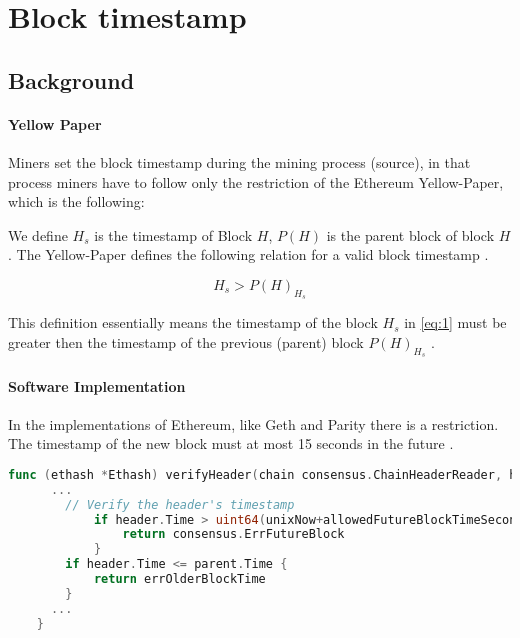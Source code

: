 \section{Block timestamp}

\subsection{Background}

\paragraph{Yellow Paper}
Miners set the block timestamp during the mining process (source), in
that process miners have to follow only the restriction of the Ethereum
Yellow-Paper, which is the following:

We define $H_s$ is the timestamp of Block $H$, $P(H)$ is the parent
block of block $H$. The Yellow-Paper defines the following relation for a valid
block timestamp \cite{ethyellowpaper2023}.

\begin{equation} \label{eq:1}
H_s > P(H)_{H_s}
\end{equation}

This definition essentially means the timestamp of the block $H_s$ in
\ref{eq:1} must be greater then the timestamp of the previous (parent) block
$P(H)_{H_s}$ \cite{ethyellowpaper2023}.

\paragraph{Software Implementation}
In the implementations of Ethereum, like Geth and Parity there is a
restriction. The timestamp of the new block must at most 15 seconds in the
future \cite{Conkas2021}. \newline

\begin{lstlisting}[language=go, caption="The restriction for the timestamp in Geth. Source: consensus/ethash/consensus.go \cite{timestamp_code}"]
    func (ethash *Ethash) verifyHeader(chain consensus.ChainHeaderReader, header, parent *types.Header, uncle bool, unixNow int64) error {
      ...
        // Verify the header's timestamp
            if header.Time > uint64(unixNow+allowedFutureBlockTimeSeconds) {
                return consensus.ErrFutureBlock
            }
        if header.Time <= parent.Time {
            return errOlderBlockTime
        }
      ...
    }
    \end{lstlisting}

